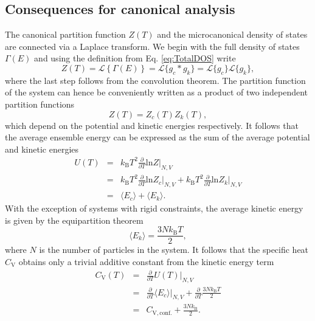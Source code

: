 \documentclass[12pt]{report}
\begin{document}
\subsection{Consequences for canonical analysis}
The canonical partition function $Z(T)$ and the microcanonical density of states are connected via a Laplace transform. We begin with the full density of states $\Gamma(E)$ and using the definition from Eq. \ref{eq:TotalDOS} write
\begin{equation}
\label{eq:Laplace}
Z(T) = \mathcal{L}\left\lbrace\Gamma(E)\right\rbrace = \mathcal{L}\{g_{c} \ast g_{k} \} = \mathcal{L}\{g_{c}\} \mathcal{L}\{g_{k}\},
\end{equation}
where the last step follows from the convolution theorem\cite{Arfken}. 
\newpage
\noindent
The partition function of the system can hence be conveniently written as a product of two independent partition functions
\begin{equation}
Z(T) = Z_{c}(T)Z_{k}(T),
\end{equation}
which depend on the potential and kinetic energies respectively. It follows that the average ensemble energy can be expressed as the sum of the average potential and kinetic energies
\begin{eqnarray}
U(T)  &=& k_{\mathrm{B}}T^{2}\frac{\partial}{\partial T} \mathrm{ln} Z\bigg|_{N,V} \nonumber \\
	 &=& k_{\mathrm{B}}T^{2}\frac{\partial}{\partial T} \mathrm{ln} Z_{c} \bigg|_{N,V}	 + k_{\mathrm{B}}T^{2}\frac{\partial}{\partial T} \mathrm{ln} Z_{k} \bigg|_{N,V}	 \nonumber \\
	 &=& \langle E_{c} \rangle + \langle E _{k}\rangle.  
\end{eqnarray}
With the exception of systems with rigid constraints, the average kinetic energy is given by the equipartition theorem 
\begin{equation}
 \langle E _{k}\rangle = \frac{3Nk_{\mathrm{B}}T}{2},
\end{equation}
where $N$ is the number of particles in the system. It follows that the specific heat $C_{\mathrm{V}}$ obtains only a trivial additive constant from the kinetic energy term
\begin{eqnarray}
C_{\mathrm{V}}(T) &=& \frac{\partial}{\partial T} U(T)\bigg|_{N,V} \nonumber \\
				 &=& \frac{\partial}{\partial T} \langle E_{c} \rangle\bigg|_{N,V} + \frac{\partial}{\partial T}\frac{3Nk_{\mathrm{B}}T}{2} \nonumber \\
				 &=& C_{\mathrm{V},\mathrm{conf.}} + \frac{3Nk_{\mathrm{B}}}{2}.
\end{eqnarray}
\end{document}
